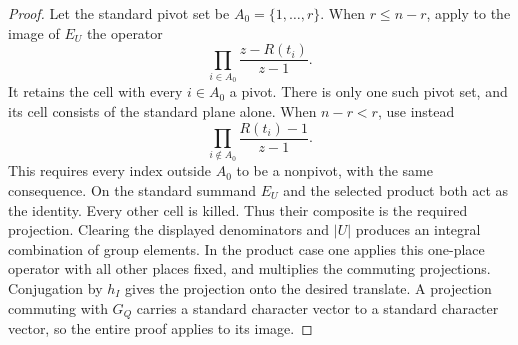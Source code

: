 \documentclass[a4paper,11pt]{article}
\theoremstyle{definition}
\theoremstyle{remark}
\numberwithin{equation}{section}
\begin{document}
\begin{proof}
Let the standard pivot set be \(A_0=\{1,\ldots,r\}\).
When \(r\le n-r\), apply to the image of \(E_U\) the operator
\[
              \prod_{i\in A_0}\frac{z-R(t_i)}{z-1}.
\]
It retains the cell with every \(i\in A_0\) a pivot. There
is only one such pivot set, and its cell consists of the
standard plane alone. When \(n-r<r\), use instead
\[
              \prod_{i\notin A_0}\frac{R(t_i)-1}{z-1}.
\]
This requires every index outside \(A_0\) to be a nonpivot,
with the same consequence. On the standard summand \(E_U\)
and the selected product both act as the identity. Every other
cell is killed. Thus their composite is the required projection.
Clearing the displayed denominators and \(|U|\) produces an
integral combination of group elements. In the product case
one applies this one-place operator with all other places fixed,
and multiplies the commuting projections. Conjugation by
\(h_I\) gives the projection onto the desired translate.
A projection commuting with \(G_Q\) carries a standard
character vector to a standard character vector, so the entire
proof applies to its image.
\end{proof}
\end{document}
